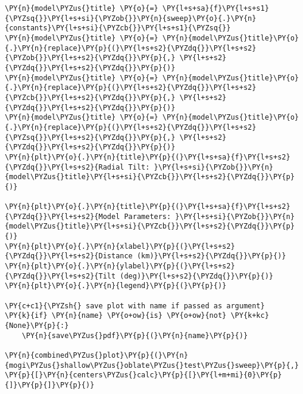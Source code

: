\begin{tcolorbox}[breakable, size=fbox, boxrule=1pt, pad at break*=1mm,colback=cellbackground, colframe=cellborder]
\begin{Verbatim}[commandchars=\\\{\}]
\PY{n}{model\PYZus{}title} \PY{o}{=} \PY{l+s+sa}{f}\PY{l+s+s1}{\PYZsq{}}\PY{l+s+si}{\PYZob{}}\PY{n}{sweep}\PY{o}{.}\PY{n}{constants}\PY{l+s+si}{\PYZcb{}}\PY{l+s+s1}{\PYZsq{}}
\PY{n}{model\PYZus{}title} \PY{o}{=} \PY{n}{model\PYZus{}title}\PY{o}{.}\PY{n}{replace}\PY{p}{(}\PY{l+s+s2}{\PYZdq{}}\PY{l+s+s2}{\PYZob{}}\PY{l+s+s2}{\PYZdq{}}\PY{p}{,} \PY{l+s+s2}{\PYZdq{}}\PY{l+s+s2}{\PYZdq{}}\PY{p}{)}
\PY{n}{model\PYZus{}title} \PY{o}{=} \PY{n}{model\PYZus{}title}\PY{o}{.}\PY{n}{replace}\PY{p}{(}\PY{l+s+s2}{\PYZdq{}}\PY{l+s+s2}{\PYZcb{}}\PY{l+s+s2}{\PYZdq{}}\PY{p}{,} \PY{l+s+s2}{\PYZdq{}}\PY{l+s+s2}{\PYZdq{}}\PY{p}{)}
\PY{n}{model\PYZus{}title} \PY{o}{=} \PY{n}{model\PYZus{}title}\PY{o}{.}\PY{n}{replace}\PY{p}{(}\PY{l+s+s2}{\PYZdq{}}\PY{l+s+s2}{\PYZsq{}}\PY{l+s+s2}{\PYZdq{}}\PY{p}{,} \PY{l+s+s2}{\PYZdq{}}\PY{l+s+s2}{\PYZdq{}}\PY{p}{)}
\PY{n}{plt}\PY{o}{.}\PY{n}{title}\PY{p}{(}\PY{l+s+sa}{f}\PY{l+s+s2}{\PYZdq{}}\PY{l+s+s2}{Radial Tilt: }\PY{l+s+si}{\PYZob{}}\PY{n}{model\PYZus{}title}\PY{l+s+si}{\PYZcb{}}\PY{l+s+s2}{\PYZdq{}}\PY{p}{)}

\PY{n}{plt}\PY{o}{.}\PY{n}{title}\PY{p}{(}\PY{l+s+sa}{f}\PY{l+s+s2}{\PYZdq{}}\PY{l+s+s2}{Model Parameters: }\PY{l+s+si}{\PYZob{}}\PY{n}{model\PYZus{}title}\PY{l+s+si}{\PYZcb{}}\PY{l+s+s2}{\PYZdq{}}\PY{p}{)}
\PY{n}{plt}\PY{o}{.}\PY{n}{xlabel}\PY{p}{(}\PY{l+s+s2}{\PYZdq{}}\PY{l+s+s2}{Distance (km)}\PY{l+s+s2}{\PYZdq{}}\PY{p}{)}
\PY{n}{plt}\PY{o}{.}\PY{n}{ylabel}\PY{p}{(}\PY{l+s+s2}{\PYZdq{}}\PY{l+s+s2}{Tilt (deg)}\PY{l+s+s2}{\PYZdq{}}\PY{p}{)}
\PY{n}{plt}\PY{o}{.}\PY{n}{legend}\PY{p}{(}\PY{p}{)}

\PY{c+c1}{\PYZsh{} save plot with name if passed as argument}
\PY{k}{if} \PY{n}{name} \PY{o+ow}{is} \PY{o+ow}{not} \PY{k+kc}{None}\PY{p}{:}
    \PY{n}{save\PYZus{}pdf}\PY{p}{(}\PY{n}{name}\PY{p}{)}

\PY{n}{combined\PYZus{}plot}\PY{p}{(}\PY{n}{mogi\PYZus{}shallow\PYZus{}oblate\PYZus{}test\PYZus{}sweep}\PY{p}{,} \PY{p}{[}\PY{n}{centers\PYZus{}calc}\PY{p}{[}\PY{l+m+mi}{0}\PY{p}{]}\PY{p}{]}\PY{p}{)}
\end{Verbatim}
\end{tcolorbox}